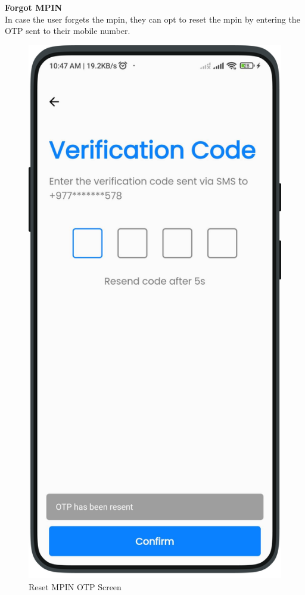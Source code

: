 \textbf{Forgot MPIN}\\
    In case the user forgets the mpin, they can opt to reset the mpin by entering the OTP sent to their mobile number. 
    \newpage
    \begin{multicols}{2} 
        \begin{figure}[H]
        \centering
        \includegraphics[width=0.6\linewidth]{images/results/mobile/OTPResend.png}
        \caption[Reset MPIN OTP Screen]{Reset MPIN OTP Screen}
        \label{fig:OTPResend.png}
        \end{figure}
        \begin{figure}[H]
        \centering

\end{figure}
\end{multicols}
